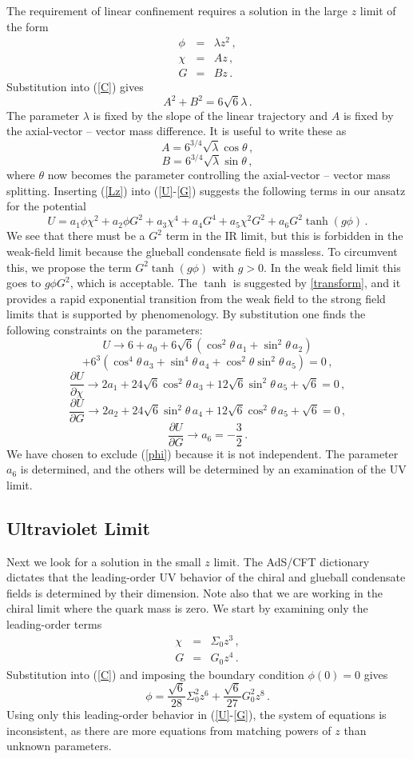 \documentclass[aps,prd,12pt,nofootinbib]{revtex4}
\newcommand{\be}{\begin{equation}}
\newcommand{\ee}{\end{equation}}
\newcommand{\ba}{\begin{eqnarray}}
\newcommand{\ea}{\end{eqnarray}}
\newcommand{\bd}{\begin{displaymath}}
\newcommand{\ed}{\end{displaymath}}
\def\tthalf{{\textstyle{\frac{3}{2}}}}
\def\rt6{\sqrt{6}}
\begin{document}
The requirement of linear confinement requires a solution in the large $z$ limit of the  form
\ba
\phi &=& \lambda z^2 \, , \\
\chi &=& Az \, , \\
G &=& B z \, .
\label{Lz}
\ea
Substitution into (\ref{C}) gives
\be
A^2 + B^2 = 6\rt6 \lambda \, .
\label{Clarge}
\ee
The parameter $\lambda$ is fixed by the slope of the linear trajectory and $A$ is fixed by the axial-vector -- vector mass difference.  
It is useful to write these as
\bd
A = 6^{3/4} \sqrt{\lambda} \cos\theta \, ,
\ed
\be
B = 6^{3/4} \sqrt{\lambda} \sin\theta \, ,
\ee
where $\theta$ now becomes the parameter controlling the axial-vector -- vector mass splitting.
Inserting (\ref{Lz}) into (\ref{U}-\ref{G}) suggests the following terms in our ansatz for the potential
\be
U =  a_1 \phi \chi^2 + a_2 \phi G^2 + a_3 \chi^4 + a_4 G^4 + a_5 \chi^2 G^2 
+ a_6 G^2 \tanh(g\phi) \, .
\ee
We see that there must be a $G^2$ term in the IR limit, but this is forbidden in the weak-field limit because the glueball condensate field is massless. 
To circumvent this, we propose the term $G^2 \tanh(g\phi)$ with $g>0$.  
In the weak field limit this goes to $g\phi G^2$, which is acceptable.  
The $\tanh$ is suggested by \ref{transform}, and it provides a rapid exponential transition from the weak field to the strong field limits that is supported by phenomenology.
By substitution one finds the following constraints on the parameters:
\bd
U \rightarrow 6 + a_0 + 6\rt6 \left( \cos^2 \theta \, a_1 + \sin^2 \theta \, a_2 \right)
\ed
\be
+ 6^3 \left( \cos^4 \theta \, a_3 + \sin^4 \theta \, a_4 + \cos^2 \theta \sin^2 \theta \, a_5 \right) = 0 \, ,
\ee
\be
\frac{\partial U}{\partial \chi} \rightarrow
2a_1 + 24\rt6 \cos^2\theta \, a_3 + 12\rt6 \sin^2\theta \, a_5 + \rt6 = 0 \, ,
\ee
\be
\frac{\partial U}{\partial G} \rightarrow
2a_2 + 24\rt6 \sin^2\theta \, a_4 + 12\rt6 \cos^2\theta \, a_5 + \rt6 = 0 \, ,
\ee
\be
\frac{\partial U}{\partial G} \rightarrow a_6 = - \tthalf \, .
\label{LargeZ2}
\ee
We have chosen to exclude (\ref{phi}) because it is not independent. 
The parameter $a_6$ is determined, and the others will be determined by an examination of the UV limit.

\subsection{Ultraviolet Limit}

Next we look for a solution in the small $z$ limit. 
The AdS/CFT dictionary dictates that the leading-order UV behavior of the chiral and glueball condensate fields is determined by their dimension. 
Note also that we are working in the chiral limit where the quark mass is zero. 
We start by examining only the leading-order terms
\ba
\chi &=& \Sigma_0 z^3 \, ,\\
G &=& G_0 z^4 \, .
\ea
Substitution into (\ref{C}) and imposing the boundary condition $\phi(0)=0$ gives
\be
\phi = \frac{\rt6}{28} \Sigma_0^2 z^6 + \frac{\rt6}{27} G_0^2 z^8 \, .
\label{Sz}
\ee
Using only this leading-order behavior in (\ref{U}-\ref{G}), the system of equations is inconsistent, as there are more equations from matching powers of $z$ than unknown parameters. 
\end{document}
